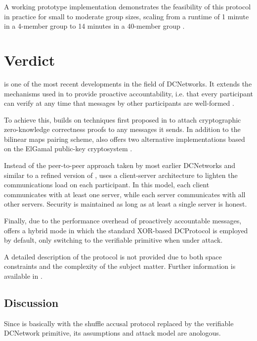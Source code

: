 A working prototype implementation demonstrates the feasibility of this protocol in practice
for small to moderate group sizes, scaling from a runtime of 1 minute in a 4-member group
to 14 minutes in a 40-member group \cite{journals/corr/abs-1004-3057}.

\section{Verdict} \label{sec:verdict}

\Verdict is one of the most recent developments in the field of \acp{DCNetwork}.
It extends the mechanisms used in \Dissent to provide proactive accountability, i.e.
that every participant can verify at any time that messages by other participants are well-formed \cite{corrigan2013proactively}.

To achieve this, \Verdict builds on techniques first proposed in \cite{juels2004dining}
to attach cryptographic zero-knowledge correctness proofs to any messages it sends.
In addition to the bilinear maps pairing scheme, \Verdict also offers two alternative
implementations based on the ElGamal public-key cryptosystem \cite{ElGamal1985}.

Instead of the peer-to-peer approach taken by most earlier \acp{DCNetwork}
and similar to a refined version of \Dissent \cite{wolinsky2012dissent},
\Verdict uses a client-server architecture to lighten the communications load
on each participant. In this model, each client communicates with at least one server,
while each server communicates with all other servers. Security
is maintained as long as at least a single server is honest.

Finally, due to the performance overhead of proactively accountable messages,
\Verdict offers a hybrid mode in which the standard XOR-based \ac{DCProtocol}
is employed by default, only switching to the verifiable primitive when under attack.

A detailed description of the protocol is not provided due to both space constraints and
the complexity of the subject matter. Further information is available in \cite{corrigan2013proactively}.

\subsection{Discussion}

Since \Verdict is basically \Dissent with the shuffle accusal protocol replaced by
the verifiable \ac{DCNetwork} primitive, its assumptions and attack model are anologous.

